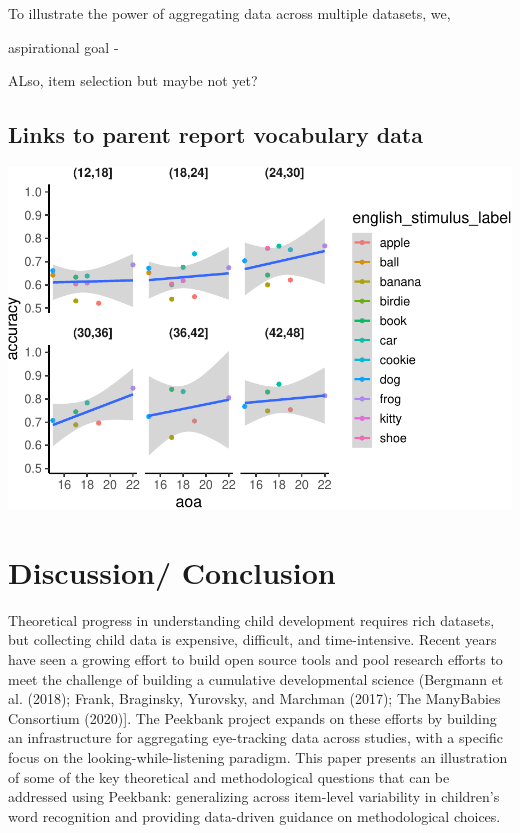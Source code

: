 \documentclass[
  english,
  man,floatsintext]{apa6}
\begin{document}
To illustrate the power of aggregating data across multiple datasets, we,

aspirational goal -

ALso, item selection but maybe not yet?

\hypertarget{links-to-parent-report-vocabulary-data}{%
\subsection{Links to parent report vocabulary data}\label{links-to-parent-report-vocabulary-data}}

\includegraphics{peekbank-brm_files/figure-latex/aoas-1.pdf}

\hypertarget{discussion-conclusion}{%
\section{Discussion/ Conclusion}\label{discussion-conclusion}}

Theoretical progress in understanding child development requires rich datasets, but collecting child data is expensive, difficult, and time-intensive.
Recent years have seen a growing effort to build open source tools and pool research efforts to meet the challenge of building a cumulative developmental science (Bergmann et al. (2018); Frank, Braginsky, Yurovsky, and Marchman (2017); The ManyBabies Consortium (2020){]}.
The Peekbank project expands on these efforts by building an infrastructure for aggregating eye-tracking data across studies, with a specific focus on the looking-while-listening paradigm.
This paper presents an illustration of some of the key theoretical and methodological questions that can be addressed using Peekbank: generalizing across item-level variability in children's word recognition and providing data-driven guidance on methodological choices.
\end{document}
